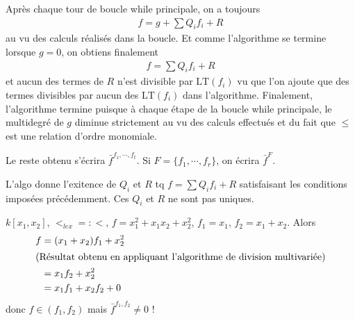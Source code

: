             \begin{remq}
                Après chaque tour de boucle while principale, on a toujours 
                \begin{align*}
                    f = g + \sum Q_if_i + R
                \end{align*}
                au vu des calculs réalisés dans la boucle. Et comme l'algorithme se termine lorsque $g = 0$, on obtiens finalement 
                \begin{align*}
                    f = \sum Q_if_i + R
                \end{align*}
                et aucun des termes de $R$ n'est divisible par $\mathrm{LT}(f_i)$ vu que l'on ajoute que des termes divisibles par aucun des $\mathrm{LT}(f_i)$ dans l'algorithme. Finalement, l'algorithme termine puisque à chaque étape de la boucle while principale, le multidegré de $g$ diminue strictement au vu des calculs effectués et du fait que $\leq$ est une relation d'ordre monomiale.
            \end{remq}
            \begin{nota}
                Le reste obtenu s'écrira $\bar f^{f_1, \cdots, f_t}$. Si $F = \{f_1, \cdots, f_r\}$, on écrira $\bar f^F$.
            \end{nota}
            \begin{remq}
                L'algo donne l'exitence de $Q_i$ et $R$ tq $f = \sum Q_if_i + R$ satisfaisant les conditions imposées précédemment. Ces $Q_i$ et $R$ ne sont pas uniques.
            \end{remq}
            \begin{expl}
                $k[x_1, x_2]$, $<_{lex} =: <$, $f = x_1^2 + x_1x_2 + x_2^2$, $f_1 = x_1$, $f_2 = x_1 + x_2$. Alors 
                \begin{align*}
                    f &= (x_1 + x_2)f_1 + x_2^2 \\
                    \intertext{(Résultat obtenu en appliquant l'algorithme de division multivariée)}
                    &= x_1f_2 + x_2^2 \\
                    &= x_1f_1 + x_2f_2 + 0 \\
                \end{align*}
                donc $f \in (f_1, f_2)$ mais $\bar f^{f_1, f_2} \neq 0$ !
            \end{expl}

